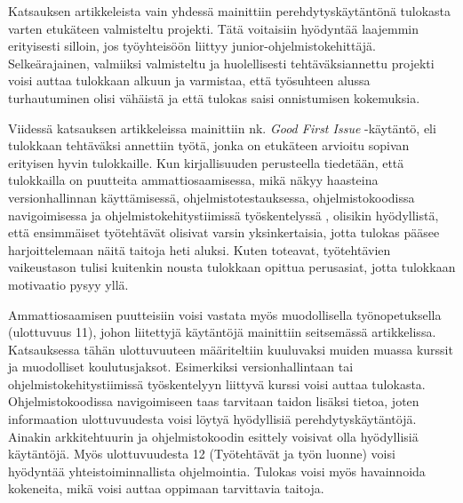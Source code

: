 \documentclass[utf8]{gradu3}
\begin{document}
Katsauksen artikkeleista vain yhdessä mainittiin perehdytyskäytäntönä tulokasta varten etukäteen valmisteltu projekti. Tätä voitaisiin hyödyntää laajemmin erityisesti silloin, jos työyhteisöön liittyy junior-ohjelmistokehittäjä. Selkeärajainen, valmiiksi valmisteltu ja huolellisesti tehtäväksiannettu projekti voisi auttaa tulokkaan alkuun ja varmistaa, että työsuhteen alussa turhautuminen olisi vähäistä ja että tulokas saisi onnistumisen kokemuksia.

Viidessä katsauksen artikkeleissa mainittiin nk. \textit{Good First Issue} -käytäntö, eli tulokkaan tehtäväksi annettiin työtä, jonka on etukäteen arvioitu sopivan erityisen hyvin tulokkaille. Kun kirjallisuuden perusteella tiedetään, että tulokkailla on puutteita ammattiosaamisessa, mikä näkyy haasteina versionhallinnan käyttämisessä, ohjelmistotestauksessa, ohjelmistokoodissa navigoimisessa ja ohjelmistokehitystiimissä työskentelyssä %
\parencites%
    {craig-ym-2018}%
    {matturro-ym-2017}%
    {dagenais-ym-2010}%
    {begel-simon-2008}%
\relax
% 
, olisikin hyödyllistä, että ensimmäiset työtehtävät olisivat varsin yksinkertaisia, jotta tulokas pääsee harjoittelemaan näitä taitoja heti aluksi. Kuten \textcite{ju-ym-2021} toteavat, työtehtävien vaikeustason tulisi kuitenkin nousta tulokkaan opittua perusasiat, jotta tulokkaan motivaatio pysyy yllä. 

Ammattiosaamisen puutteisiin voisi vastata myös muodollisella työnopetuksella (ulottuvuus 11), johon liitettyjä käytäntöjä mainittiin seitsemässä artikkelissa. Katsauksessa tähän ulottuvuuteen määriteltiin kuuluvaksi muiden muassa kurssit ja muodolliset koulutusjaksot. Esimerkiksi versionhallintaan tai ohjelmistokehitystiimissä työskentelyyn liittyvä kurssi voisi auttaa tulokasta. Ohjelmistokoodissa navigoimiseen taas tarvitaan taidon lisäksi tietoa, joten informaation ulottuvuudesta voisi löytyä hyödyllisiä perehdytyskäytäntöjä. Ainakin arkkitehtuurin ja ohjelmistokoodin esittely voisivat olla hyödyllisiä käytäntöjä. Myös ulottuvuudesta 12 (Työtehtävät ja työn luonne) voisi hyödyntää yhteistoiminnallista ohjelmointia. Tulokas voisi myös havainnoida kokeneita, mikä voisi auttaa oppimaan tarvittavia taitoja.
\end{document}
